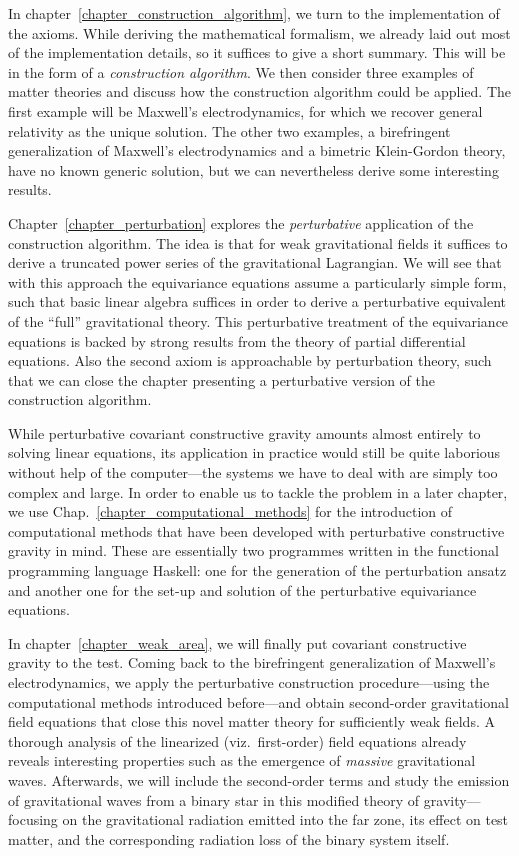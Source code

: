 In chapter~\ref{chapter_construction_algorithm}, we turn to the implementation of the axioms. While deriving the mathematical formalism, we already laid out most of the implementation details, so it suffices to give a short summary. This will be in the form of a \emph{construction algorithm}. We then consider three examples of matter theories and discuss how the construction algorithm could be applied. The first example will be Maxwell's electrodynamics, for which we recover general relativity as the unique solution. The other two examples, a birefringent generalization of Maxwell's electrodynamics and a bimetric Klein-Gordon theory, have no known generic solution, but we can nevertheless derive some interesting results.

Chapter~\ref{chapter_perturbation} explores the \emph{perturbative} application of the construction algorithm. The idea is that for weak gravitational fields it suffices to derive a truncated power series of the gravitational Lagrangian. We will see that with this approach the equivariance equations assume a particularly simple form, such that basic linear algebra suffices in order to derive a perturbative equivalent of the ``full'' gravitational theory. This perturbative treatment of the equivariance equations is backed by strong results from the theory of partial differential equations. Also the second axiom is approachable by perturbation theory, such that we can close the chapter presenting a perturbative version of the construction algorithm.

While perturbative covariant constructive gravity amounts almost entirely to solving linear equations, its application in practice would still be quite laborious without help of the computer---the systems we have to deal with are simply too complex and large. In order to enable us to tackle the problem in a later chapter, we use Chap.~\ref{chapter_computational_methods} for the introduction of computational methods that have been developed with perturbative constructive gravity in mind. These are essentially two programmes written in the functional programming language Haskell: one for the generation of the perturbation ansatz and another one for the set-up and solution of the perturbative equivariance equations.

In chapter~\ref{chapter_weak_area}, we will finally put covariant constructive gravity to the test. Coming back to the birefringent generalization of Maxwell's electrodynamics, we apply the perturbative construction procedure---using the computational methods introduced before---and obtain second-order gravitational field equations that close this novel matter theory for sufficiently weak fields. A thorough analysis of the linearized (viz.\ first-order) field equations already reveals interesting properties such as the emergence of \emph{massive} gravitational waves. Afterwards, we will include the second-order terms and study the emission of gravitational waves from a binary star in this modified theory of gravity---focusing on the gravitational radiation emitted into the far zone, its effect on test matter, and the corresponding radiation loss of the binary system itself.

